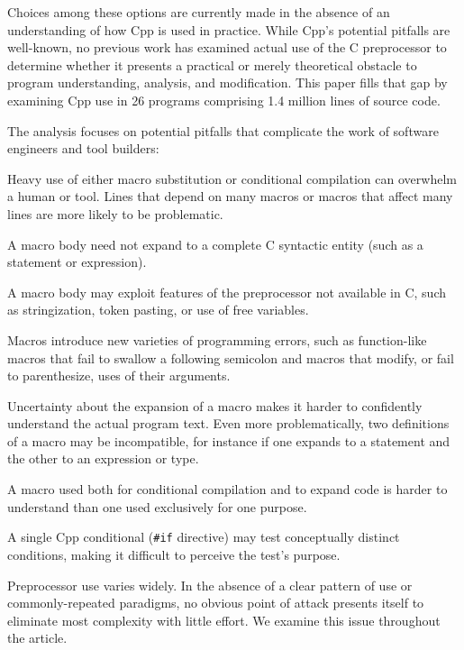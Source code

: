 \documentclass[10pt]{article}
\def\typeofdocument{article}    %
\def\numpackages{26}
\def\numlines{1.4 million}      %
\begin{document}
Choices among these options are currently made in the absence of
an understanding of how Cpp is used in practice.
While  Cpp's potential pitfalls are well-known, no
previous work has examined actual use of the C preprocessor to
determine whether it presents a practical or merely theoretical
obstacle to program understanding, analysis, and modification.  This
paper fills that gap by examining Cpp use in {\numpackages} programs
comprising {\numlines} lines of source code.

The analysis focuses on potential pitfalls that complicate the work of
software engineers and tool builders:
\begin{description}\itemsep 0pt \parskip 0pt
\item[high total use {\rm (Sections~\ref{sec:directives}, \ref{sec:macro-usage}, and~\ref{sec:dependence}):}]
  Heavy use of either macro substitution or conditional compilation can
  overwhelm a human or tool.  Lines that
  depend on many macros or macros that affect many lines are more
  likely to be problematic.
\item[complicated bodies {\rm (Section~\ref{sec:categorization}):}]
  A macro body need not expand to a complete C syntactic entity (such as a
  statement or expression).
\item[extra-linguistic features {\rm (Section~\ref{sec:extra-linguistic}):}]
  A macro body may exploit features of the preprocessor not available in C,
  such as stringization, token pasting, or use of free variables.
\item[macro pitfalls {\rm (Section~\ref{sec:lint}):}]
  Macros introduce new varieties of programming errors, such as
  function-like macros that fail to swallow a following semicolon and
  macros that modify, or fail to parenthesize, uses of their arguments.
\item[multiple definitions {\rm (Sections~\ref{sec:mult-def}--\ref{sec:inconsistent}):}]
  Uncertainty about the expansion of a macro makes it harder to confidently
  understand the
  actual program text.  Even more problematically, two definitions of a
  macro may be incompatible, for instance if one expands to a statement and the
  other to an expression or type.
\item[inconsistent usage {\rm (Section~\ref{sec:inconsistent-usage}):}]
  A macro used both for conditional compilation and to expand code is
  harder to understand than one used exclusively for one purpose.
\item[mixed tests {\rm (Section~\ref{sec:ccd}):}]
  A single Cpp conditional ({\tt \#if} directive) may test conceptually
  distinct conditions, making it difficult to perceive the
  test's purpose.
\item[variation in use{\rm :}]
  Preprocessor use varies widely.
  In the absence of a clear pattern of use or commonly-repeated paradigms,
  no obvious point of attack presents itself to eliminate most complexity
  with little effort.  We examine this issue throughout the \typeofdocument.
\end{description}
\end{document}

